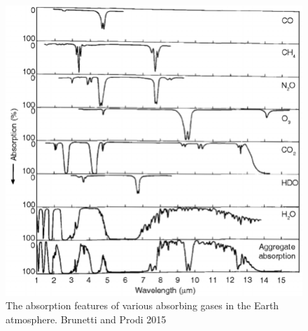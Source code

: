 \documentclass[a4paper, 12pt, twoside]{article}
\begin{document}
\begin{figure}[t!]
\center
\includegraphics[width=0.7\linewidth]{Figure/Infrared-absorption-spectra-for-various-atmospheric-gases.png}
\caption{The absorption features of various absorbing gases in the Earth atmosphere. Brunetti and Prodi 2015}
\label{fig:atmospheric_absorption}
\end{figure}
\end{document}
